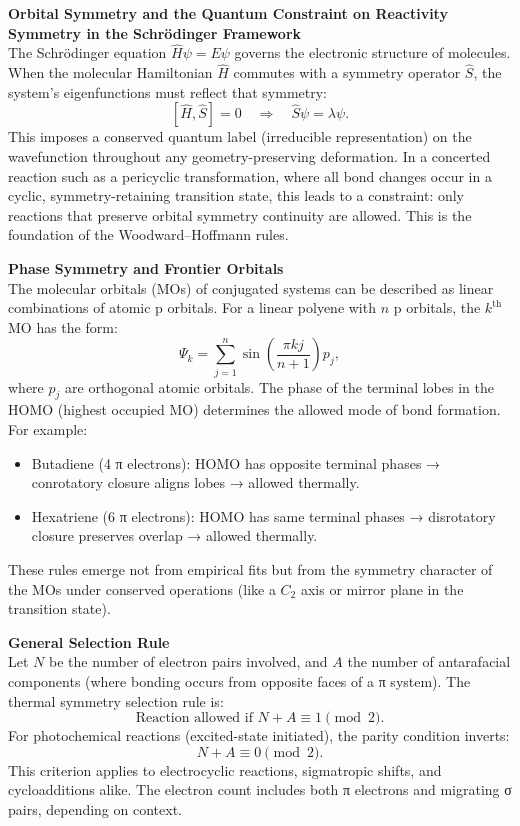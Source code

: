 \begin{technical}
{\Large\textbf{Orbital Symmetry and the Quantum Constraint on Reactivity}}\\[0.7em]

\noindent\textbf{Symmetry in the Schrödinger Framework}\\[0.5em]
The Schrödinger equation \( \hat{H}\psi = E\psi \) governs the electronic structure of molecules. When the molecular Hamiltonian \( \hat{H} \) commutes with a symmetry operator \( \hat{S} \), the system’s eigenfunctions must reflect that symmetry:
\[
[\hat{H}, \hat{S}] = 0 \quad \Rightarrow \quad \hat{S}\psi = \lambda\psi.
\]
This imposes a conserved quantum label (irreducible representation) on the wavefunction throughout any geometry-preserving deformation. In a concerted reaction such as a pericyclic transformation, where all bond changes occur in a cyclic, symmetry-retaining transition state, this leads to a constraint: only reactions that preserve orbital symmetry continuity are allowed. This is the foundation of the Woodward–Hoffmann rules.

\noindent\textbf{Phase Symmetry and Frontier Orbitals}\\[0.5em]
The molecular orbitals (MOs) of conjugated systems can be described as linear combinations of atomic p orbitals. For a linear polyene with \( n \) p orbitals, the \( k^\text{th} \) MO has the form:
\[
\Psi_k = \sum_{j=1}^n \sin\left( \frac{\pi k j}{n+1} \right) p_j,
\]
where \( p_j \) are orthogonal atomic orbitals. The phase of the terminal lobes in the HOMO (highest occupied MO) determines the allowed mode of bond formation. For example:
\begin{itemize}
\item Butadiene (4 π electrons): HOMO has opposite terminal phases → conrotatory closure aligns lobes → allowed thermally.
\item Hexatriene (6 π electrons): HOMO has same terminal phases → disrotatory closure preserves overlap → allowed thermally.
\end{itemize}
These rules emerge not from empirical fits but from the symmetry character of the MOs under conserved operations (like a \( C_2 \) axis or mirror plane in the transition state).

\noindent\textbf{General Selection Rule}\\[0.5em]
Let \( N \) be the number of electron pairs involved, and \( A \) the number of antarafacial components (where bonding occurs from opposite faces of a π system). The thermal symmetry selection rule is:
\[
\text{Reaction allowed if } N + A \equiv 1 \pmod{2}.
\]
For photochemical reactions (excited-state initiated), the parity condition inverts:
\[
N + A \equiv 0 \pmod{2}.
\]
This criterion applies to electrocyclic reactions, sigmatropic shifts, and cycloadditions alike. The electron count includes both π electrons and migrating σ pairs, depending on context.


\end{technical}
